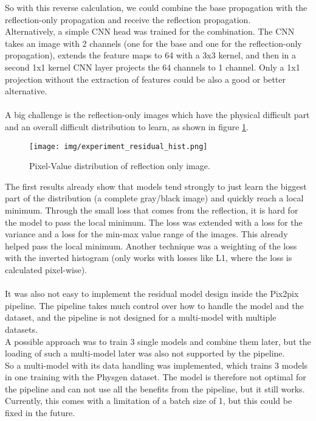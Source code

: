 		\vspace{10mm}
		So with this reverse calculation, we could combine the base propagation with the reflection-only propagation and receive the reflection propagation.\\
		Alternatively, a simple CNN head was trained for the combination. The CNN takes an image with 2 channels (one for the base and one for the reflection-only propagation), extends the feature maps to 64 with a 3x3 kernel, and then in a second 1x1 kernel CNN layer projects the 64 channels to 1 channel. Only a 1x1 projection without the extraction of features could be also a good or better alternative.\\
		\\
		A big challenge is the reflection-only images which have the physical difficult part and an overall difficult distribution to learn, as shown in figure \ref{fig:experiment_residual_hist}. 
		
		\begin{figure}[H]
			\centering
			\texttt{[image: img/experiment\_residual\_hist.png]}
			\caption[Pixel-Value distribution of reflection only image.]{Pixel-Value distribution of reflection only image.}
			\label{fig:experiment_residual_hist}
		\end{figure}
		\FloatBarrier
		\clearpage
		The first results already show that models tend strongly to just learn the biggest part of the distribution (a complete gray/black image) and quickly reach a local minimum. Through the small loss that comes from the reflection, it is hard for the model to pass the local minimum. The loss was extended with a loss for the variance and a loss for the min-max value range of the images. This already helped pass the local minimum. Another technique was a weighting of the loss with the inverted histogram (only works with losses like L1, where the loss is calculated pixel-wise).\\
		\\
		It was also not easy to implement the residual model design inside the Pix2pix pipeline. The pipeline takes much control over how to handle the model and the dataset, and the pipeline is not designed for a multi-model with multiple datasets.\\
		A possible approach was to train 3 single models and combine them later, but the loading of such a multi-model later was also not supported by the pipeline.\\
		So a multi-model with its data handling was implemented, which trains 3 models in one training with the Physgen dataset. The model is therefore not optimal for the pipeline and can not use all the benefits from the pipeline, but it still works. Currently, this comes with a limitation of a batch size of 1, but this could be fixed in the future.
		
